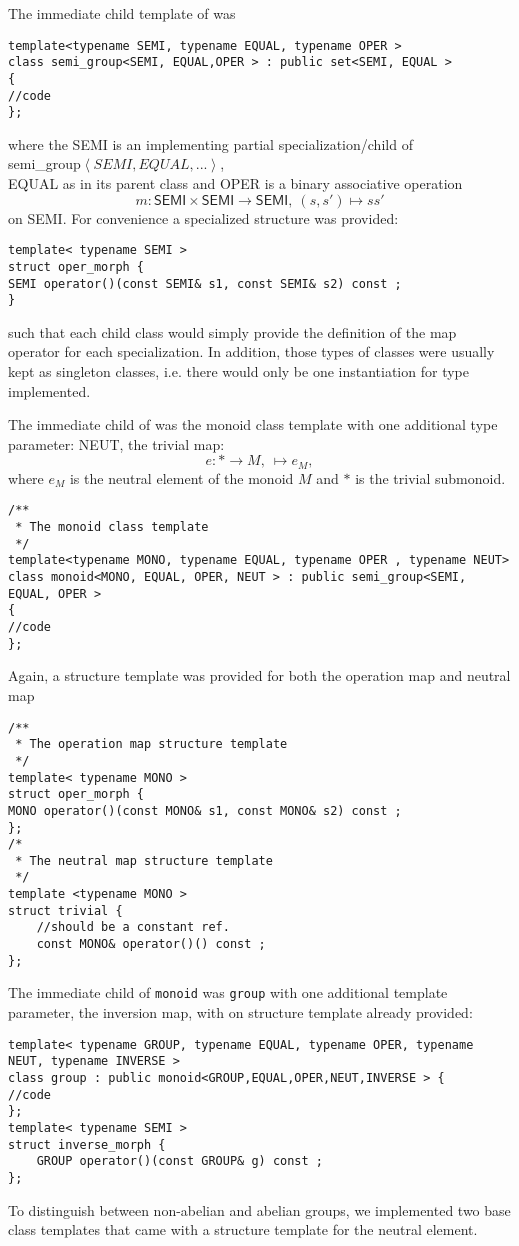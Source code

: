 \item The immediate child template of \lstst was 
\begin{lstlisting}[frame=single]
template<typename SEMI, typename EQUAL, typename OPER >
class semi_group<SEMI, EQUAL,OPER > : public set<SEMI, EQUAL >
{
//code
};
\end{lstlisting}
 where the \textsf{SEMI} is an implementing partial specialization/child of\\ \indent \textsf{semi\_{}group$\left<SEMI,EQUAL,... \right>$},\\
 \textsf{EQUAL} as in its parent class and \textsf{OPER} is a binary associative operation
$$m : \mathsf{SEMI} \times \mathsf{SEMI} \longrightarrow \mathsf{SEMI},\ (s,s') \longmapsto s s'$$
on \textsf{SEMI}. For convenience a specialized structure was provided:
\begin{lstlisting}[frame=single]
template< typename SEMI >
struct oper_morph {
SEMI operator()(const SEMI& s1, const SEMI& s2) const ;
}
\end{lstlisting}
such that each child class would simply provide the definition of the map operator for each specialization. In addition, those types of classes were usually kept as singleton classes, i.e. there would only be one instantiation for type implemented.
\item The immediate child of \lstst was the monoid class template with one additional type parameter: \textsf{NEUT}, the trivial map:
$$e : \ast \longrightarrow M,\ \longmapsto e_M,$$
where $e_M$ is the neutral element of the monoid $M$ and $\ast$ is the trivial submonoid.
\begin{lstlisting}[frame=single]
/**
 * The monoid class template
 */
template<typename MONO, typename EQUAL, typename OPER , typename NEUT>
class monoid<MONO, EQUAL, OPER, NEUT > : public semi_group<SEMI, EQUAL, OPER >
{
//code
};
\end{lstlisting}
Again, a structure template was provided for both the operation map and neutral map
\begin{lstlisting}[frame=single]
/**
 * The operation map structure template
 */
template< typename MONO >
struct oper_morph {
MONO operator()(const MONO& s1, const MONO& s2) const ;
};
/*
 * The neutral map structure template
 */
template <typename MONO >
struct trivial {
	//should be a constant ref.
	const MONO& operator()() const ;
};
\end{lstlisting}
\item The immediate child of \texttt{monoid} was \texttt{group} with one additional template parameter, the inversion map, with on structure template already provided:
\begin{lstlisting}[frame=single]
template< typename GROUP, typename EQUAL, typename OPER, typename NEUT, typename INVERSE >
class group : public monoid<GROUP,EQUAL,OPER,NEUT,INVERSE > {
//code
};
template< typename SEMI >
struct inverse_morph {
	GROUP operator()(const GROUP& g) const ;
};
\end{lstlisting}
To distinguish between non-abelian and abelian groups, we implemented two base class templates that came with a structure template for the neutral element.
\en

